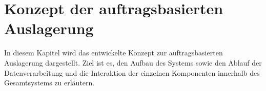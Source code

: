 \section{Konzept der auftragsbasierten Auslagerung}
In diesem Kapitel wird das entwickelte Konzept zur auftragsbasierten Auslagerung dargestellt. Ziel ist es, den Aufbau des Systems sowie den Ablauf der Datenverarbeitung und die Interaktion der einzelnen Komponenten innerhalb des Gesamtsystems zu erläutern.


